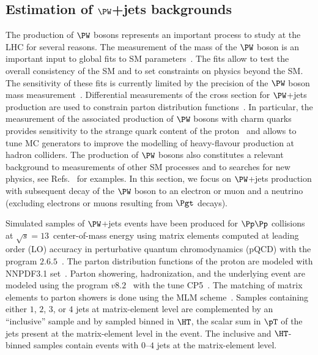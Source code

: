 \subsection{Estimation of \texorpdfstring{$\PW$}{W}+jets backgrounds}
\label{sec:examples_background_yield}

The production of $\PW$ bosons represents an important process to study at the LHC for several reasons.
The measurement of the mass of the $\PW$ boson is an important input to global fits to SM parameters~\cite{Baak:2014ora}.
The fits allow to test the overall consistency of the SM and to set constraints on physics beyond the SM.
The sensitivity of these fits is currently limited by the precision of the $\PW$ boson mass measurement~\cite{Baak:2014ora}.
Differential measurements of the cross section for $\PW$+jets production 
are used to constrain parton distribution functions~\cite{CMS:2016qqr,ATLAS:2016nqi,ATLAS:2019fgb,CMS:2020cph}.
In particular, the measurement of the associated production of $\PW$ bosons with charm quarks
provides sensitivity to the strange quark content of the proton~\cite{CMS:2013wql,ATLAS:2014jkm,CMS:2018dxg} 
and allows to tune MC generators to improve the modelling of heavy-flavour production at hadron colliders.
The production of $\PW$ bosons also constitutes a relevant background to measurements of other SM processes
and to searches for new physics, see Refs.~\cite{ATLAS:2014aga,Aad:2019yxi,CMS-HIG-13-027,CMS-HIG-17-006} for examples.
In this section, we focus on $\PW$+jets production with subsequent decay of the $\PW$ boson to an electron or muon and a neutrino 
(excluding electrons or muons resulting from $\Pgt$ decays).

Simulated samples of $\PW$+jets events have been produced for $\Pp\Pp$ collisions at $\sqrt{s}=13$~\TeV center-of-mass energy
using matrix elements computed at leading order (LO) accuracy in perturbative quantum chromodynamics (pQCD)
with the program \MGvATNLO $2.6.5$~\cite{MGvATNLO}.
The parton distribution functions of the proton are modeled with NNPDF3.1 set~\cite{NNPDF:2017mvq}.
Parton showering, hadronization, and the underlying event are modeled using the program \PYTHIA $v8.2$~\cite{PYTHIA} with the tune \textrm{CP5}~\cite{Sirunyan:2019dfx}.
The matching of matrix elements to parton showers is done using the \textrm{MLM} scheme~\cite{Alwall:2007fs}.
Samples containing either $1$, $2$, $3$, or $4$ jets at matrix-element level are complemented by an ``inclusive'' sample 
and by sampled binned in $\HT$, the scalar sum in $\pT$ of the jets present at the matrix-element level in the event.
The inclusive and $\HT$-binned samples contain events with $0$--$4$ jets at the matrix-element level.

